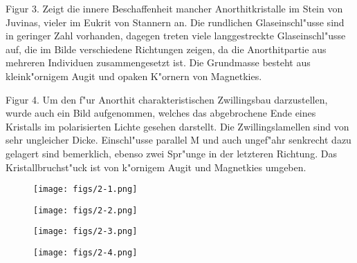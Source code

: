 \documentclass[a4paper, 11pt, oneside, polutonikogreek, german]{article}
\begin{document}
Figur 3. Zeigt die innere Beschaffenheit mancher Anorthitkristalle im Stein von Juvinas, vieler im Eukrit von Stannern an. Die rundlichen Glaseinschl"usse sind in geringer Zahl vorhanden, dagegen treten viele langgestreckte Glaseinschl"usse auf, die im Bilde verschiedene Richtungen zeigen, da die Anorthitpartie aus mehreren Individuen zusammengesetzt ist. Die Grundmasse besteht aus kleink"ornigem Augit und opaken K"ornern von Magnetkies.

Figur 4. Um den f"ur Anorthit charakteristischen Zwillingsbau darzustellen, wurde auch ein Bild aufgenommen, welches das abgebrochene Ende eines Kristalls im polarisierten Lichte gesehen darstellt. Die Zwillingslamellen sind von sehr ungleicher Dicke. Einschl"usse parallel M und auch ungef"ahr senkrecht dazu gelagert sind bemerklich, ebenso zwei Spr"unge in der letzteren Richtung. Das Kristallbruchst"uck ist von k"ornigem Augit und Magnetkies umgeben.
\clearpage

\vspace*{\fill}
\begin{figure}[H]
\centering
\texttt{[image: figs/2-1.png]}
\caption{}
\end{figure}
\vspace*{\fill}
\clearpage

\vspace*{\fill}
\begin{figure}[H]
\centering
\texttt{[image: figs/2-2.png]}
\caption{}
\end{figure}
\vspace*{\fill}
\clearpage

\vspace*{\fill}
\begin{figure}[H]
\centering
\texttt{[image: figs/2-3.png]}
\caption{}
\end{figure}
\vspace*{\fill}
\clearpage

\vspace*{\fill}
\begin{figure}[H]
\centering
\texttt{[image: figs/2-4.png]}
\caption{}
\end{figure}
\vspace*{\fill}
\clearpage
\end{document}
